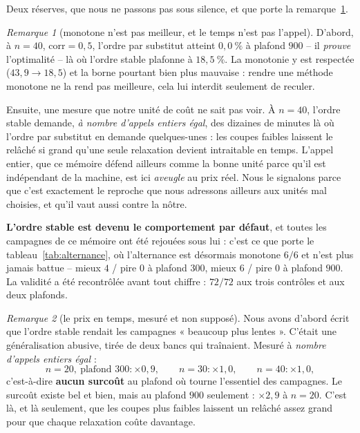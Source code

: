 \documentclass[11pt,a4paper]{article}
\theoremstyle{plain}
\theoremstyle{remark}
\newtheorem{remark}{Remarque}
\begin{document}
Deux réserves, que nous ne passons pas sous silence, et que porte la
remarque~\ref{rem:vivierprix}.

\begin{remark}[monotone n'est pas meilleur, et le temps n'est pas l'appel]
\label{rem:vivierprix}
D'abord, à $n=40$, $\text{corr}=0{,}5$, l'ordre par substitut atteint
$0{,}0\ \%$ à plafond $900$ -- il \emph{prouve} l'optimalité -- là où
l'ordre stable plafonne à $18{,}5\ \%$. La monotonie y est respectée
($43{,}9\to 18{,}5$) et la borne pourtant bien plus mauvaise : rendre une
méthode monotone ne la rend pas meilleure, cela lui interdit seulement de
reculer.

Ensuite, une mesure que notre unité de coût ne sait pas voir. À $n=40$,
l'ordre stable demande, \emph{à nombre d'appels entiers égal}, des dizaines
de minutes là où l'ordre par substitut en demande quelques-unes : les coupes
faibles laissent le relâché si grand qu'une seule relaxation devient
intraitable en temps. L'appel entier, que ce mémoire défend ailleurs comme
la bonne unité parce qu'il est indépendant de la machine, est ici
\emph{aveugle} au prix réel. Nous le signalons parce que c'est exactement le
reproche que nous adressons ailleurs aux unités mal choisies, et qu'il vaut
aussi contre la nôtre.
\end{remark}

\noindent
\textbf{L'ordre stable est devenu le comportement par défaut}, et toutes les
campagnes de ce mémoire ont été rejouées sous lui : c'est ce que porte le
tableau~\ref{tab:alternance}, où l'alternance est désormais monotone $6/6$
et n'est plus jamais battue -- mieux $4$ / pire $0$ à plafond $300$,
mieux $6$ / pire $0$ à plafond $900$. La validité a été recontrôlée avant
tout chiffre : $72/72$ aux trois contrôles et aux deux plafonds.

\begin{remark}[le prix en temps, mesuré et non supposé]
Nous avons d'abord écrit que l'ordre stable rendait les campagnes
« beaucoup plus lentes ». C'était une généralisation abusive, tirée de deux
bancs qui traînaient. Mesuré à \emph{nombre d'appels entiers égal} :
\[
  n=20,\ \text{plafond }300 : \times 0{,}9,\qquad
  n=30 : \times 1{,}0,\qquad
  n=40 : \times 1{,}0,
\]
c'est-à-dire \textbf{aucun surcoût} au plafond où tourne l'essentiel des
campagnes. Le surcoût existe bel et bien, mais au plafond $900$ seulement :
$\times 2{,}9$ à $n=20$. C'est là, et là seulement, que les coupes plus
faibles laissent un relâché assez grand pour que chaque relaxation coûte
davantage.
\end{remark}
\end{document}
